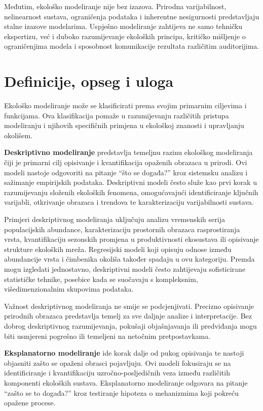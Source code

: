 \documentclass[11pt,oneside]{book}
\begin{document}
Međutim, ekološko modeliranje nije bez izazova. Prirodna varijabilnost, nelinearnost sustava, ograničenja podataka i inherentne nesigurnosti predstavljaju stalne izazove modelarima. Uspješno modeliranje zahtijeva ne samo tehničku ekspertizu, već i duboko razumijevanje ekoloških principa, kritičko mišljenje o ograničenjima modela i sposobnost komunikacije rezultata različitim auditorijima.

\section{Definicije, opseg i uloga}

Ekološko modeliranje može se klasificirati prema svojim primarnim ciljevima i funkcijama. Ova klasifikacija pomaže u razumijevanju različitih pristupa modeliranju i njihovih specifičnih primjena u ekološkoj znanosti i upravljanju okolišem.

\textbf{Deskriptivno modeliranje} predstavlja temeljnu razinu ekološkog modeliranja čiji je primarni cilj opisivanje i kvantifikacija opaženih obrazaca u prirodi. Ovi modeli nastoje odgovoriti na pitanje ``što se događa?'' kroz sistemsku analizu i sažimanje empirijskih podataka. Deskriptivni modeli često služe kao prvi korak u razumijevanju složenih ekoloških fenomena, omogućavajući identificiranje ključnih varijabli, otkrivanje obrazaca i trendova te karakterizaciju varijabilnosti sustava.

Primjeri deskriptivnog modeliranja uključuju analizu vremenskih serija populacijskih abundance, karakterizaciju prostornih obrazaca rasprostiranja vrsta, kvantifikaciju sezonskih promjena u produktivnosti ekosustava ili opisivanje strukture ekoloških mreža. Regresijski modeli koji opisuju odnose između abundancije vrsta i čimbenika okoliša također spadaju u ovu kategoriju. Premda mogu izgledati jednostavno, deskriptivni modeli često zahtijevaju sofisticirane statističke tehnike, posebice kada se suočavaju s kompleksnim, višedimenzionalnim skupovima podataka.

Važnost deskriptivnog modeliranja ne smije se podcjenjivati. Precizno opisivanje prirodnih obrazaca predstavlja temelj za sve daljnje analize i interpretacije. Bez dobrog deskriptivnog razumijevanja, pokušaji objašnjavanja ili predviđanja mogu biti usmjereni pogrešno ili temeljeni na netočnim pretpostavkama.

\textbf{Eksplanatorno modeliranje} ide korak dalje od pukog opisivanja te nastoji objasniti zašto se opaženi obrasci pojavljuju. Ovi modeli fokusiraju se na identificiranje i kvantifikaciju uzročno-posljedičnih veza između različitih komponenti ekoloških sustava. Eksplanatorno modeliranje odgovara na pitanje ``zašto se to događa?'' kroz testiranje hipoteza o mehanizmima koji pokreću opažene procese.
\end{document}
